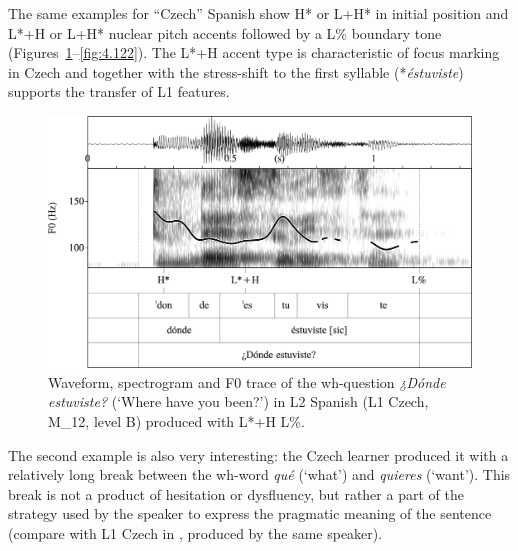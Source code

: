 The same examples for “Czech” Spanish show H* or L+H* in initial position and L*+H or L+H* nuclear pitch accents followed by a L\% boundary tone (Figures~\ref{fig:4.121}--\ref{fig:4.122}). The L*+H accent type is characteristic of focus marking in Czech and together with the stress-shift to the first syllable (*\textit{éstuviste}) supports the transfer of L1 features.

\begin{figure}


\includegraphics[width=\textwidth]{figures/Figure_4.121.png}


\caption{Waveform, spectrogram and F0 trace of the wh-question \textit{¿Dónde estuviste?} (‘Where have you been?’) in L2 Spanish (L1 Czech, M\_12, level B) produced with L*+H L\%.}
\label{fig:4.121}
\end{figure}

\begin{sloppypar}
The second example is also very interesting: the Czech learner produced it with a relatively long break between the wh-word \textit{qué} (‘what’) and \textit{quieres} (‘want’). This break is not a product of hesitation or dysfluency, but rather a part of the strategy used by the speaker to express the pragmatic meaning of the sentence (compare with L1 Czech in , produced by the same speaker).
\end{sloppypar}

